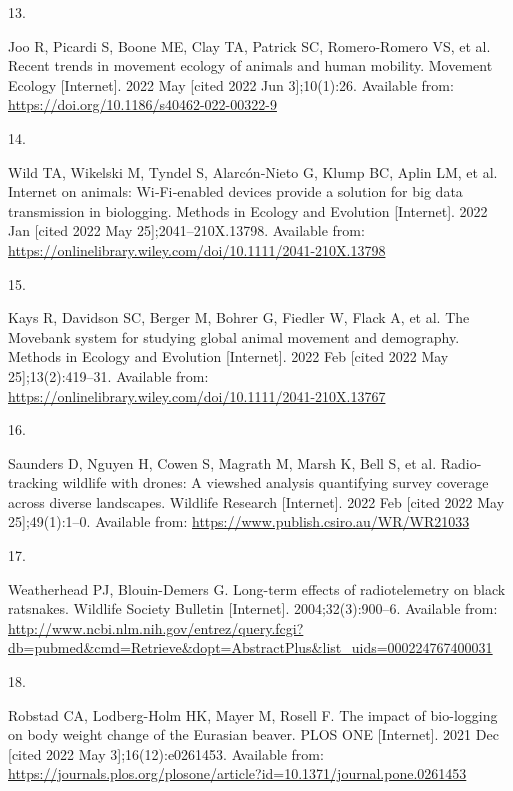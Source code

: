 \documentclass[10pt,a4paper]{article}
\newlength{\cslhangindent}
\newlength{\csllabelwidth}
\newlength{\cslentryspacingunit} %
\newenvironment{CSLReferences}[2] %
 {%
  \setlength{\parindent}{0pt}
  \ifodd #1
  \let\oldpar\par
  \def\par{\hangindent=\cslhangindent\oldpar}
  \fi
  \setlength{\parskip}{#2\cslentryspacingunit}
 }%
 {}
\newcommand{\CSLLeftMargin}[1]{\parbox[t]{\csllabelwidth}{#1}}
\newcommand{\CSLRightInline}[1]{\parbox[t]{\linewidth - \csllabelwidth}{#1}\break}
\begin{document}
\begin{CSLReferences}{0}{0}
\leavevmode{}%
\CSLLeftMargin{13. }
\CSLRightInline{Joo R, Picardi S, Boone ME, Clay TA, Patrick SC, Romero-Romero VS, et al. Recent trends in movement ecology of animals and human mobility. Movement Ecology {[}Internet{]}. 2022 May {[}cited 2022 Jun 3{]};10(1):26. Available from: \url{https://doi.org/10.1186/s40462-022-00322-9}}

\leavevmode{}%
\CSLLeftMargin{14. }
\CSLRightInline{Wild TA, Wikelski M, Tyndel S, Alarcón‐Nieto G, Klump BC, Aplin LM, et al. Internet on animals: {Wi}‐{Fi}‐enabled devices provide a solution for big data transmission in biologging. Methods in Ecology and Evolution {[}Internet{]}. 2022 Jan {[}cited 2022 May 25{]};2041--210X.13798. Available from: \url{https://onlinelibrary.wiley.com/doi/10.1111/2041-210X.13798}}

\leavevmode{}%
\CSLLeftMargin{15. }
\CSLRightInline{Kays R, Davidson SC, Berger M, Bohrer G, Fiedler W, Flack A, et al. The {Movebank} system for studying global animal movement and demography. Methods in Ecology and Evolution {[}Internet{]}. 2022 Feb {[}cited 2022 May 25{]};13(2):419--31. Available from: \url{https://onlinelibrary.wiley.com/doi/10.1111/2041-210X.13767}}

\leavevmode{}%
\CSLLeftMargin{16. }
\CSLRightInline{Saunders D, Nguyen H, Cowen S, Magrath M, Marsh K, Bell S, et al. Radio-tracking wildlife with drones: A viewshed analysis quantifying survey coverage across diverse landscapes. Wildlife Research {[}Internet{]}. 2022 Feb {[}cited 2022 May 25{]};49(1):1--0. Available from: \url{https://www.publish.csiro.au/WR/WR21033}}

\leavevmode{}%
\CSLLeftMargin{17. }
\CSLRightInline{Weatherhead PJ, Blouin-Demers G. Long-term effects of radiotelemetry on black ratsnakes. Wildlife Society Bulletin {[}Internet{]}. 2004;32(3):900--6. Available from: \url{http://www.ncbi.nlm.nih.gov/entrez/query.fcgi?db=pubmed\&cmd=Retrieve\&dopt=AbstractPlus\&list_uids=000224767400031}}

\leavevmode{}%
\CSLLeftMargin{18. }
\CSLRightInline{Robstad CA, Lodberg-Holm HK, Mayer M, Rosell F. The impact of bio-logging on body weight change of the {Eurasian} beaver. PLOS ONE {[}Internet{]}. 2021 Dec {[}cited 2022 May 3{]};16(12):e0261453. Available from: \url{https://journals.plos.org/plosone/article?id=10.1371/journal.pone.0261453}}


\end{CSLReferences}
\end{document}
